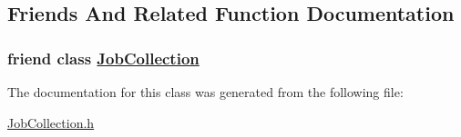 \subsection{Friends And Related Function Documentation}
\hypertarget{classglite_1_1wmsui_1_1api_1_1resultStruct_n0}{
\subsubsection[JobCollection]{\setlength{\rightskip}{0pt plus 5cm}friend class \hyperlink{classglite_1_1wmsui_1_1api_1_1JobCollection}{Job\-Collection}}}
\label{classglite_1_1wmsui_1_1api_1_1resultStruct_n0}




The documentation for this class was generated from the following file:\begin{CompactItemize}
\item 
\hyperlink{JobCollection_8h}{Job\-Collection.h}\end{CompactItemize}
